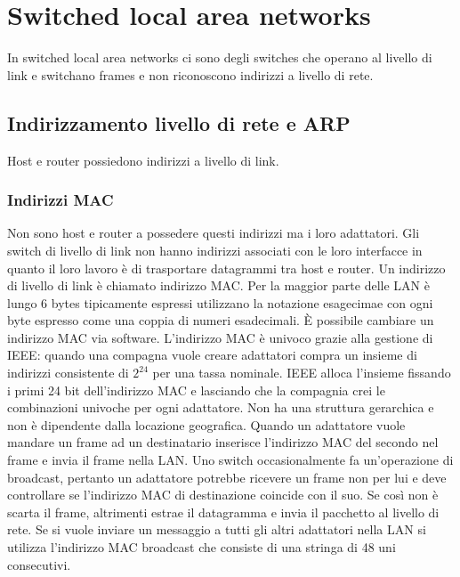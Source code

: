 \section{Switched local area networks}
In switched local area networks ci sono degli switches che operano al livello di link e switchano frames e non riconoscono indirizzi a livello di rete. 
\subsection{Indirizzamento livello di rete e ARP}
Host e router possiedono indirizzi a livello di link. 
\subsubsection{Indirizzi MAC}
Non sono host e router a possedere questi indirizzi ma i loro adattatori. Gli switch di livello di link non hanno indirizzi associati con le loro interfacce in quanto il loro lavoro \`e di trasportare datagrammi tra 
host e router. Un indirizzo di livello di link \`e chiamato indirizzo MAC. Per la maggior parte delle LAN \`e lungo 6 bytes tipicamente  espressi utilizzano la notazione esagecimae con ogni byte espresso come una 
coppia di numeri esadecimali. \`E possibile cambiare un indirizzo MAC via software. L'indirizzo MAC \`e univoco grazie alla gestione di IEEE: quando una compagna vuole creare adattatori compra un insieme di
indirizzi consistente di $2^{24}$ per una tassa nominale. IEEE alloca l'insieme fissando i primi 24 bit dell'indirizzo MAC e lasciando che la compagnia crei le combinazioni univoche per ogni adattatore. Non ha
una struttura gerarchica e non \`e dipendente dalla locazione geografica. Quando un adattatore vuole mandare un frame ad un destinatario inserisce l'indirizzo MAC del secondo nel frame e invia il frame nella 
LAN. Uno switch occasionalmente fa un'operazione di broadcast, pertanto un adattatore potrebbe ricevere un frame non per lui e deve controllare se l'indirizzo MAC di destinazione coincide con il suo. Se cos\`i
non \`e scarta il frame, altrimenti estrae il datagramma e invia il pacchetto al livello di rete. Se si vuole inviare un messaggio a tutti gli altri adattatori nella LAN si utilizza l'indirizzo MAC broadcast  che consiste
di una stringa di 48 uni consecutivi. 
